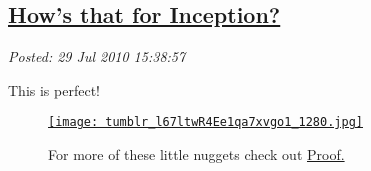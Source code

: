 %

\subsection*{\href{https://bakerjd99.wordpress.com/2010/07/29/hows-that-for-inception/}{How's that for Inception?}}


\noindent\emph{Posted: 29 Jul 2010 15:38:57}
\vspace{6pt}

This is perfect!


\captionsetup[figure]{labelformat=empty}
\begin{figure}[htbp]
  \centering
\href{http://proofmathisbeautiful.tumblr.com/post/875272253/fuckyeahmath-riceeater-okay-one-more}{\texttt{[image: tumblr\_l67ltwR4Ee1qa7xvgo1\_1280.jpg]}}
\caption{ 
For more of these little nuggets check out
\href{http://proofmathisbeautiful.tumblr.com/}{Proof.}
}
\label{fig:710X0}
\end{figure}




%